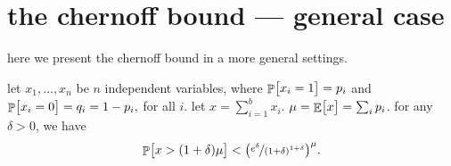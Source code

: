 \section{the chernoff bound --- general case}

here we present the chernoff bound in a more general settings.

\begin{fragment}{}
    \begin{theorem}
        let $x_1, \ldots, x_n$ be $n$ independent variables, where
        \begin{math}
            \Prob{ \bigl. x_i = 1 } =p_i
        \end{math}
        and
        \begin{math}
            \Prob{ \bigl. x_i = 0 } =q_i = 1-p_i, 
        \end{math}
        for all $i$.  let $x = \sum_{i=1}^{b} x_i$.
        $\mu = \mathop{\mathbb{E}}\!\left[ {\bigl. x} \right] = \sum_i p_i$.  for any $\delta > 0$, we
        have
        \begin{equation*}
            \Prob{ \bigl. x > (1+\delta)\mu } < \pth{
               \nicefrac{e^\delta}{(1+\delta)^{1+\delta}}}^\mu.
        \end{equation*}

         
    \end{theorem}%

\end{fragment}

